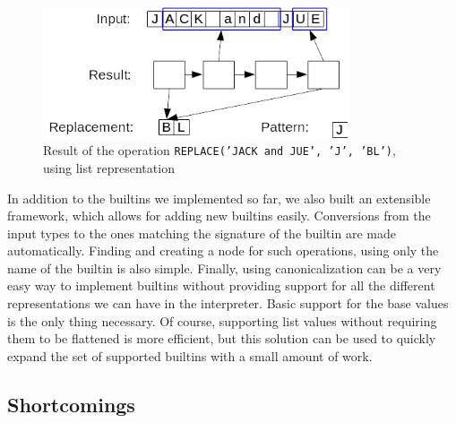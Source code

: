 \documentclass[twoside,11pt,a4paper]{article}
\newcommand{\pls}[1]{\small\texttt{#1}\normalsize}
\begin{document}
\begin{figure}[h]
	\centering
	\includegraphics[width=9cm]{./graphs/ReplacementExample.png}
	\caption{Result of the operation \pls{REPLACE('JACK and JUE', 'J', 'BL')}, using list representation}
	\label{fig:replaceexample}
\end{figure}

In addition to the builtins we implemented so far, we also built an extensible framework, which allows for adding new builtins easily. Conversions from the input types to the ones matching the signature of the builtin are made automatically. Finding and creating a node for such operations, using only the name of the builtin is also simple. Finally, using canonicalization can be a very easy way to implement builtins without providing support for all the different representations we can have in the interpreter. Basic support for the base values is the only thing necessary. Of course, supporting list values without requiring them to be flattened is more efficient, but this solution can be used to quickly expand the set of supported builtins with a small amount of work.

\subsection{Shortcomings}


\end{document}
